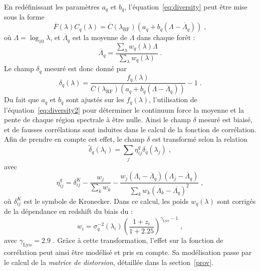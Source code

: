 \documentclass[11pt, twoside, a4paper, openright]{report}
\begin{document}
En redéfinissant les paramètres $a_q$ et $b_q$, l'équation~\ref{eq:diversity} peut être mise sous la forme
\begin{equation}
  \label{eq:diversity2}
  \overline F(\lambda) C_q(\lambda) = \overline C(\lambda_{\mathrm{RF}})(a_q + b_q (\Lambda - \overline \Lambda_q))  \; ,
\end{equation}
où $\Lambda = \log_{10} \lambda$, et $\overline \Lambda_q$ est la moyenne de $\Lambda$ dans chaque forêt :
\begin{equation}
  \label{eq:lambda_mean}
  \overline \Lambda_q = \frac{\sum\limits_{\lambda} w_q(\lambda) \Lambda}{\sum\limits_{\lambda} w_q(\lambda)}  \; .
\end{equation}
Le champ $ \delta_q$ mesuré est donc donné par
\begin{equation}
  \label{eq:deltaF2}
   \delta_q(\lambda) = \frac{f_q(\lambda)}{\overline C(\lambda_{\mathrm{RF}})(a_q + b_q (\Lambda - \overline \Lambda_q))} - 1  \; .
\end{equation}
Du fait que $a_q$ et $b_q$ sont ajustés sur les $f_q(\lambda)$, l'utilisation de l'équation~\ref{eq:diversity2} pour déterminer le continuum force la moyenne et la pente de chaque région spectrale à être nulle. Ainsi le champ $\delta$ mesuré est biaisé, et de fausses corrélations sont induites dans le calcul de la fonction de corrélation.
Afin de prendre en compte cet effet, le champ $\delta$ est transformé selon la relation
\begin{equation}
  \label{eq:deltaF3}
  \tilde \delta_q(\lambda_i) = \sum\limits_j \eta_{ij}^q \delta_q(\lambda_j)  \; ,
\end{equation}
avec
\begin{equation}
  \eta^q_{ij}
  =
  \delta^K_{ij}
  - \frac{
    w_{j}
  }{
    \sum\limits_{k} w_{k}
  }
  -
  \frac{
    w_{j} \left( \Lambda_{i}-\overline \Lambda_{q} \right) \left(\Lambda_j-\overline \Lambda_{q} \right)
  }{
    \sum\limits_{k} w_{k} \left( \Lambda_{k}-\overline {\Lambda_{q}} \right)^{2}
  }
  \; ,
  \label{eq:proj1}
\end{equation}
où $\delta^K_{ij}$ est le symbole de Kronecker.
Dans ce calcul, les poids $w_q(\lambda)$ sont corrigés de la dépendance en redshift du biais du \lya{} :
\begin{equation}
  \label{eq:weights2}
  w_{i}
  =
  \sigma_q^{-2}(\lambda_i)
  \left( \frac{1+z_{i}}{1+2.25} \right)^{\gamma_{\mathrm{Ly}\alpha} -1} \;,
\end{equation}
avec $\gamma_{\mathrm{Ly}\alpha} = 2.9$ \citep{mcdonald_ly_2006}.
Grâce à cette transformation, l'effet sur la fonction de corrélation peut ainsi être modélisé et pris en compte. Sa modélisation passe par le calcul de la \emph{matrice de distorsion}, détaillée dans la section~\ref{prov}.
\end{document}
